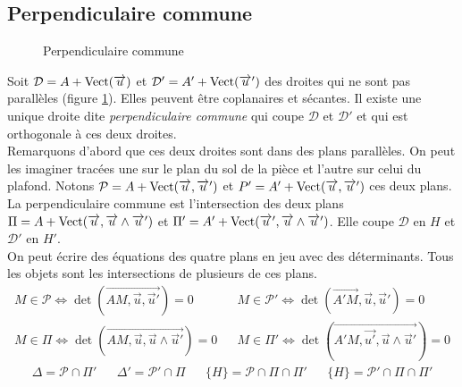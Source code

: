 \subsection{Perpendiculaire commune} 
\begin{figure}[ht]
 \centering

\caption{Perpendiculaire commune}
\label{fig:C2006_3}
\end{figure}
Soit $\mathcal D = A+\mathop{\mathrm{Vect}}(\overrightarrow{u})$ et $\mathcal{D}'= A'+\mathop{\mathrm{Vect}}(\overrightarrow{u}')$ des droites qui ne sont pas parallèles (figure \ref{fig:C2006_3}). Elles peuvent être coplanaires et sécantes. Il existe une unique droite dite \emph{perpendiculaire commune} qui coupe $\mathcal D$ et $\mathcal D '$ et qui est orthogonale à ces deux droites.\\
Remarquons d'abord que ces deux droites sont dans des plans parallèles. On peut les imaginer tracées une sur le plan du sol de la pièce et l'autre sur celui du plafond. Notons $\mathcal P = A+\mathop{\mathrm{Vect}}(\overrightarrow{u},\overrightarrow{u}')$ et $P' = A'+\mathop{\mathrm{Vect}}(\overrightarrow{u},\overrightarrow{u}')$ ces deux plans.\\
La perpendiculaire commune est l'intersection des deux plans $\Pi = A+\mathop{\mathrm{Vect}}(\overrightarrow{u},\overrightarrow{u}\wedge\overrightarrow{u}')$ et $\Pi' = A'+\mathop{\mathrm{Vect}}(\overrightarrow{u}',\overrightarrow{u}\wedge\overrightarrow{u}')$. Elle coupe $\mathcal D$ en $H$ et $\mathcal{D}'$ en $H'$.\\
On peut écrire des équations des quatre plans en jeu avec des déterminants. Tous les objets sont les intersections de plusieurs de ces plans.
\begin{align*}
 M\in \mathcal P \Leftrightarrow \det(\overrightarrow{AM,\overrightarrow{u},\overrightarrow{u}'})=0 & &
 M\in \mathcal P' \Leftrightarrow \det(\overrightarrow{A'M},\overrightarrow{u},\overrightarrow{u}')=0 \\
 M\in \Pi \Leftrightarrow \det(\overrightarrow{AM,\overrightarrow{u},\overrightarrow{u}\wedge \overrightarrow{u}'})=0 & &
 M\in \Pi' \Leftrightarrow \det(\overrightarrow{A'M,\overrightarrow{u'},\overrightarrow{u}\wedge \overrightarrow{u}'})=0
\end{align*}
 \begin{align*}
  \Delta = \mathcal{P}\cap \Pi' & & \Delta' = \mathcal{P}'\cap \Pi
 & & \{H\}=\mathcal{P}\cap \Pi \cap\Pi' & & \{H\}=\mathcal{P}'\cap \Pi \cap\Pi'
 \end{align*}

